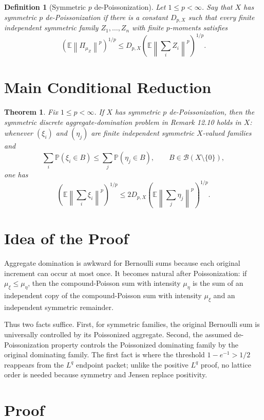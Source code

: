 \documentclass[11pt]{article}
\newtheorem{theorem}{Theorem}
\newtheorem{definition}{Definition}
\newcommand{\E}{\mathbb E}
\newcommand{\Pp}{\mathbb P}
\newcommand{\norm}[1]{\left\lVert #1\right\rVert}
\begin{document}
\begin{definition}[Symmetric \(p\) de-Poissonization]
Let \(1\le p<\infty\).  Say that \(X\) has symmetric \(p\)
de-Poissonization if there is a constant \(D_{p,X}\) such that every finite
independent symmetric family \(Z_1,\ldots,Z_n\) with finite \(p\)-moments
satisfies
\[
  \left(\E\norm{\Pi_{\mu_Z}}^p\right)^{1/p}
  \le
  D_{p,X}
  \left(\E\norm{\sum_i Z_i}^p\right)^{1/p}.
\]
\end{definition}

\section*{Main Conditional Reduction}

\begin{theorem}
\label{thm:conditional}
Fix \(1\le p<\infty\).  If \(X\) has symmetric \(p\) de-Poissonization, then
the symmetric discrete aggregate-domination problem in Remark 12.10 holds in
\(X\): whenever \((\xi_i)\) and \((\eta_j)\) are finite independent symmetric
\(X\)-valued families and
\[
  \sum_i \Pp(\xi_i\in B)
  \le
  \sum_j \Pp(\eta_j\in B),
  \qquad B\in\mathcal B(X\setminus\{0\}),
\]
one has
\[
  \left(\E\norm{\sum_i\xi_i}^p\right)^{1/p}
  \le
  2D_{p,X}
  \left(\E\norm{\sum_j\eta_j}^p\right)^{1/p}.
\]
\end{theorem}

\section*{Idea of the Proof}

Aggregate domination is awkward for Bernoulli sums because each original
increment can occur at most once.  It becomes natural after Poissonization:
if \(\mu_\xi\le\mu_\eta\), then the compound-Poisson sum with intensity
\(\mu_\eta\) is the sum of an independent copy of the compound-Poisson sum
with intensity \(\mu_\xi\) and an independent symmetric remainder.

Thus two facts suffice.  First, for symmetric families, the original Bernoulli
sum is universally controlled by its Poissonized aggregate.  Second, the
assumed de-Poissonization property controls the Poissonized dominating family
by the original dominating family.  The first fact is where the threshold
\(1-e^{-1}>1/2\) reappears from the \(L^q\) endpoint packet; unlike the
positive \(L^q\) proof, no lattice order is needed because symmetry and
Jensen replace positivity.

\section*{Proof}
\end{document}
